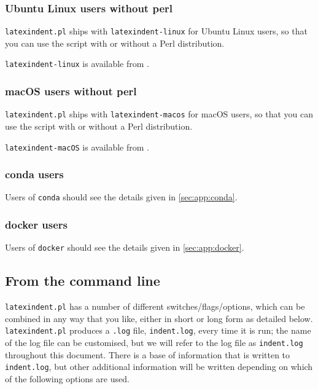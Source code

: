 \subsubsection{Ubuntu Linux users without perl}
 \texttt{latexindent.pl} ships with \texttt{latexindent-linux} for Ubuntu
 Linux users, so that you can use the script with or without a Perl distribution.
   

 \texttt{latexindent-linux} is available from \cite{latexindent-home}.

\subsubsection{macOS users without perl}
 \texttt{latexindent.pl} ships with \texttt{latexindent-macos} for macOS
 users, so that you can use the script with or without a Perl distribution.
   

 \texttt{latexindent-macOS} is available from \cite{latexindent-home}.

\subsubsection{conda users}
 Users of \texttt{conda} should see the details given in \cref{sec:app:conda}.

\subsubsection{docker users}
 Users of \texttt{docker} should see the details given in \cref{sec:app:docker}.

\subsection{From the command line}\label{sec:commandline}
 \texttt{latexindent.pl} has a number of different switches/flags/options, which
 can be combined in any way that you like, either in short or long form as detailed below.
 \texttt{latexindent.pl} produces a \texttt{.log} file, \texttt{indent.log}, every time it
 is run; the name of the log file can be customised, but we will refer to the log file as
 \texttt{indent.log} throughout this document. There is a base of information that is
 written to \texttt{indent.log}, but other additional information will be written
 depending on which of the following options are used.


